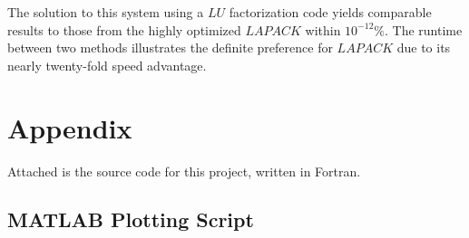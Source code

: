 \documentclass[12pt]{article}
\begin{document}
The solution to this system using a $LU$ factorization code yields comparable results to those from the highly optimized $LAPACK$ within $10^{-12}\%$.  The runtime between two methods illustrates the definite preference for $LAPACK$ due to its nearly twenty-fold speed advantage.
\newpage


\newpage
\section*{Appendix}
Attached is the source code for this project, written in Fortran.

\subsection*{MATLAB Plotting Script}

\end{document}
